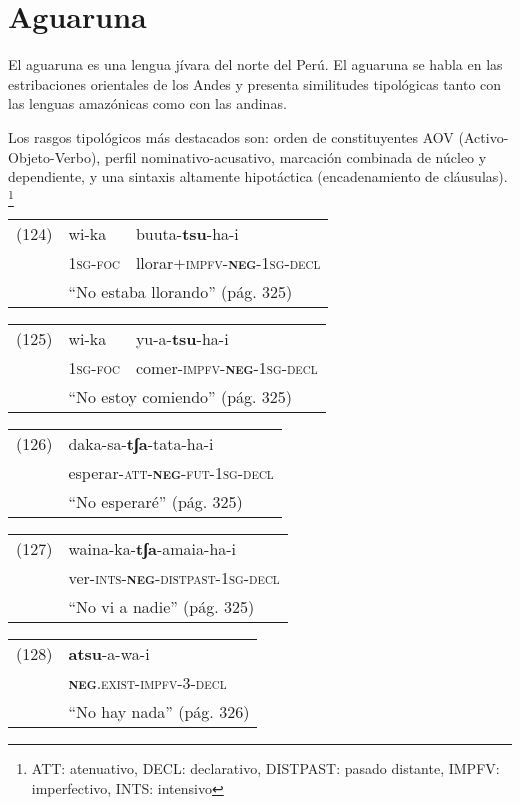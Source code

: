 \section*{Aguaruna}

\noindent El aguaruna es una lengua jívara del norte del Perú. El aguaruna se habla en las estribaciones orientales de los Andes y presenta similitudes tipológicas tanto con las lenguas amazónicas como con las andinas. 

Los rasgos tipológicos más destacados son: orden de constituyentes AOV (Activo-Objeto-Verbo), perfil nominativo-acusativo, marcación combinada de núcleo y dependiente, y una sintaxis altamente hipotáctica (encadenamiento de cláusulas).
\footnote{ATT: atenuativo, DECL: declarativo, DISTPAST: pasado distante, IMPFV: imperfectivo, INTS: intensivo}
\vspace{0.5cm}

{\setmainfont{Charis SIL} 

\begin{tabular}{lll}
(124) & wi-ka & buuta-\textbf{tsu}-ha-i  \\
& \textsc{1sg-foc} & llorar+\textsc{impfv-\textbf{neg}-1sg-decl} \\
& \multicolumn{2}{l}{``No estaba llorando'' (pág. 325)}
\end{tabular} \vspace{0.5cm}

\begin{tabular}{lll}
(125) & wi-ka & yu-a-\textbf{tsu}-ha-i \\
& \textsc{1sg-foc} & comer-\textsc{impfv-\textbf{neg}-1sg-decl} \\
& \multicolumn{2}{l}{``No estoy comiendo'' (pág. 325)}
\end{tabular} \vspace{0.5cm}

\begin{tabular}{ll}
(126) & daka-sa-\textbf{tʃa}-tata-ha-i \\
& esperar-\textsc{att-\textbf{neg}-fut-1sg-decl} \\
& ``No esperaré'' (pág. 325)
\end{tabular} \vspace{0.5cm}

\begin{tabular}{ll}
(127) & waina-ka-\textbf{tʃa}-amaia-ha-i \\
& ver-\textsc{ints-\textbf{neg}-distpast-1sg-decl} \\
& ``No vi a nadie'' (pág. 325)
\end{tabular} \vspace{0.5cm}

\begin{tabular}{ll}
(128) & \textbf{atsu}-a-wa-i \\
& \textsc{\textbf{neg}.exist-impfv-3-decl} \\
& ``No hay nada'' (pág. 326)
\end{tabular} \vspace{0.5cm}

}

